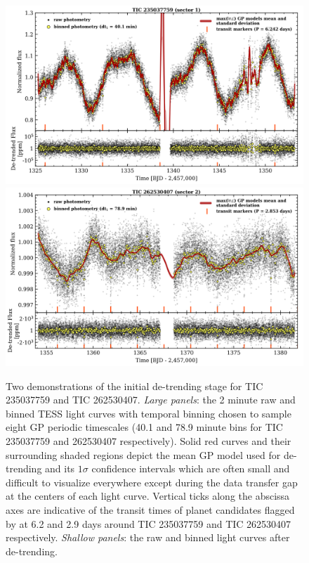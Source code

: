 \begin{figure}
  \centering
  \includegraphics[width=0.9\hsize]{figures/GPdetrend_235037759.png}
  \includegraphics[width=0.9\hsize]{figures/GPdetrend_262530407.png}
  \caption[Examples of GP detrending of TESS light curves.]
          {Two demonstrations of the \pipeline{} initial de-trending stage for TIC 235037759 and TIC 262530407.
    \emph{Large panels}: the 2 minute raw and binned TESS light curves with temporal
    binning chosen to sample eight GP periodic timescales (40.1 and 78.9 minute bins for TIC 235037759
    and 262530407 respectively). Solid red curves and their surrounding shaded regions
    depict the mean GP model used for de-trending and its $1\sigma$ confidence intervals which are often
    small and difficult to visualize everywhere except during the data transfer gap at the centers of each
    light curve. Vertical ticks along the abscissa axes are indicative of the transit times of planet
    candidates flagged by \pipeline{} at
    6.2 and 2.9 days around TIC 235037759 and TIC 262530407 respectively.
    \emph{Shallow panels}: the raw and binned light curves after de-trending.}
  \label{fig:detrend}
\end{figure}

